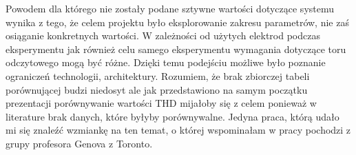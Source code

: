 \begin{frame}[t]
    
\end{frame}




\begin{frame}[t]
    \vspace{-1em}
    \begin{block}{\af}
    \end{block}
    {\renewcommand\normalsize{\small}%
\normalsize
Powodem dla którego nie zostały podane sztywne wartości dotyczące systemu wynika z tego, że celem projektu było eksplorowanie zakresu parametrów, nie zaś  osiąganie konkretnych wartości. 
W zależności od użytych elektrod podczas eksperymentu jak również celu samego eksperymentu wymagania dotyczące toru odczytowego mogą być różne.
Dzięki temu podejściu możliwe było poznanie ograniczeń technologii, architektury.
Rozumiem, że brak zbiorczej tabeli porównującej budzi niedosyt ale jak przedstawiono na samym początku prezentacji porównywanie wartości THD mijałoby się z celem ponieważ w literature brak danych, które byłyby porównywalne. Jedyna praca, którą udało mi się znaleźć wzmiankę na ten temat, o której wspominałam w pracy pochodzi z grupy profesora Genova z Toronto.}


    
\end{frame}




